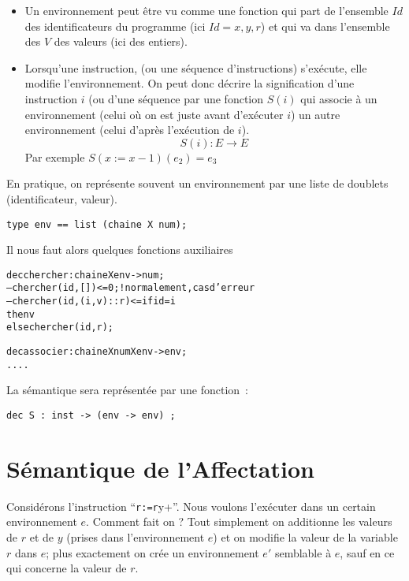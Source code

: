 \begin{itemize}
\item Un environnement peut \^etre vu comme une fonction qui part de
l'ensemble $Id$ des identificateurs du programme (ici $Id = {x,y,r}$) et
qui va dans l'ensemble des $V$ des valeurs (ici des entiers).  

\item
Lorsqu'une instruction, (ou une séquence d'instructions) s'exécute,
elle modifie l'environnement. On peut donc décrire la signification
d'une instruction $i$ (ou d'une séquence par une fonction $S(i)$ qui
associe à un environnement (celui o\`u on est juste avant d'exécuter
$i$) un autre environnement (celui d'après l'exécution de $i$).  
$$S(i) : E
\rightarrow E $$
Par exemple $S( x:=x-1 ) (e_2) = e_3$
\end{itemize}

En pratique, on représente souvent un environnement par une liste de
		doublets (identificateur, valeur).  

\begin{verbatim}
type env == list (chaine X num);
\end{verbatim}

Il nous faut alors quelques fonctions auxiliaires

\begin{alltt}
dec chercher : chaine X env  -> num ;
--- chercher ( id , [] ) <= 0 ;		! normalement, cas d'erreur
--- chercher ( id,(i,v)::r ) <= if id=i 
				then v 
				else chercher(id,r);

dec associer : chaine X num X env  ->  env ;
		....

\end{alltt}

La sémantique sera représentée par une fonction~:

\begin{verbatim}
dec S : inst -> (env -> env) ;
\end{verbatim}


\section{Sémantique de l'Affectation}

Considérons l'instruction ``\verb+r:=r+y+''. Nous voulons l'exécuter
dans un certain environnement $e$. Comment fait on ? Tout simplement on
additionne les valeurs de $r$ et de $y$ (prises dans l'environnement $e$) et
on modifie la valeur de la variable $r$ dans $e$; plus exactement on crée
un environnement $e'$ semblable à $e$, sauf en ce qui concerne la valeur
de $r$.

